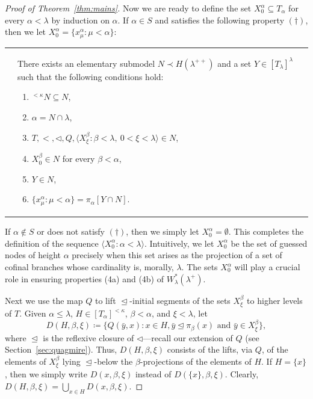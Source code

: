 \documentclass[]{amsart}
\theoremstyle{definition}
\theoremstyle{remark}
\begin{document}
\begin{proof}[Proof of Theorem~\ref{thm:mains}]
Now we are ready to define the set $X^\alpha_0 \subseteq T_\alpha$ for every $\alpha < \lambda$ by induction on $\alpha$. If $\alpha \in S$ and satisfies the following property $(\dagger)$, then we let $X^\alpha_0 = \{x_\mu^\alpha : \mu < \alpha\}$:
\begin{center}
  \begin{tabular}{@{}r@{\qquad}l@{}}
    \raisebox{-.5\height}{\textnormal{($\dagger$)}} &
    \begin{minipage}[c]{\dimexpr\linewidth-5em\relax}
      There exists an elementary submodel
      $N \prec H(\lambda^{++})$ and a set
      $Y \in [T_{\lambda}]^{\lambda}$ such that the following conditions hold:
      \begin{enumerate}
        \item ${}^{< \kappa} N \subseteq N$,
        \item $\alpha=N\cap\lambda$,
        \item $T,{<},{\lhd},Q,
          \langle X^\beta_\xi:\beta<\lambda,\ 0<\xi<\lambda\rangle\in N$,
        \item $X^\beta_0\in N$ for every $\beta<\alpha$,
        \item $Y\in N$,
        \item $\{x_\mu^\alpha:\mu<\alpha\}=\pi_\alpha[Y\cap N]$.
      \end{enumerate}
    \end{minipage}
  \end{tabular}
\end{center}
If $\alpha \not\in S$ or does not satisfy $(\dagger)$, then we simply let $X^\alpha_0 = \emptyset$. This completes the definition of the sequence $\langle X^\alpha_0 : \alpha < \lambda\rangle$. Intuitively, we let $X^\alpha_0$ be the set of guessed nodes of height $\alpha$ precisely when this set arises as the projection of a set of cofinal branches whose cardinality is, morally, $\lambda$. The sets $X^\alpha_0$ will play a crucial role in ensuring properties (4a) and (4b) of $W^*_{\lambda}(\lambda^+)$.


Next we use the map $Q$ to lift $\trianglelefteq$-initial segments of the sets $X^\beta_\xi$ to higher levels of $T$. Given $\alpha \le \lambda$, $H \in [T_\alpha]^{<\kappa}$, $\beta < \alpha$, and $\xi < \lambda$, let
\[
D(H, \beta, \xi) \coloneqq \big\{Q(\bar{y}, x) : x \in H, \bar{y} \trianglelefteq \pi_\beta(x) \text{ and } \bar{y}\in X^\beta_\xi\big\},
\]
where $\trianglelefteq$ is the reflexive closure of $\lhd$---recall our extension of $Q$ (see Section~\ref{sec:quagmire}). Thus, $D(H, \beta, \xi)$ consists of the lifts, via $Q$, of the elements of $X^\beta_\xi$ lying $\trianglelefteq$-below the $\beta$-projections of the elements of $H$. If $H = \{x\}$, then we simply write $D(x, \beta, \xi)$ instead of $D(\{x\}, \beta, \xi)$. Clearly, $D(H, \beta, \xi) = \bigcup_{x \in H} D(x, \beta, \xi)$.


\end{proof}
\end{document}

